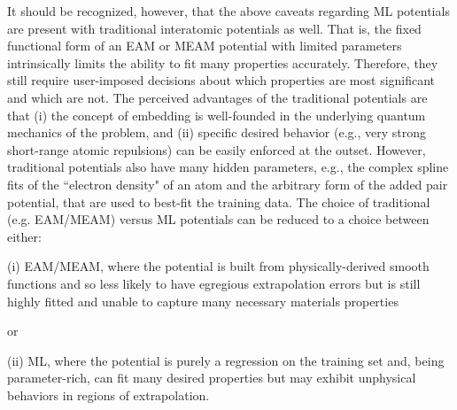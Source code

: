 \documentclass{article}
\begin{document}
It should be recognized, however, that the above caveats regarding ML potentials are present with traditional interatomic potentials as well.
That is, the fixed functional form of an EAM or MEAM potential with limited parameters intrinsically limits the ability to fit many properties accurately. 
Therefore, they still require user-imposed decisions about which properties are most significant and which are not.
The perceived advantages of the traditional potentials are that (i) the concept of embedding is well-founded in the underlying quantum mechanics of the problem, and (ii) specific desired behavior (e.g., very strong short-range atomic repulsions) can be easily enforced at the outset.
However, traditional potentials also have many hidden parameters, e.g., the complex spline fits of the ``electron density" of an atom and the arbitrary form of the added pair potential, that are used to best-fit the training data.  The choice of traditional (e.g. EAM/MEAM) versus ML potentials can be reduced to a choice between either:

(i) EAM/MEAM, where the potential is built from physically-derived smooth functions and so less likely to have egregious extrapolation errors but is still highly fitted and unable to capture many necessary materials properties  

or

(ii) ML, where the potential is purely a regression on the training set and, being parameter-rich, can fit many desired properties but may exhibit unphysical behaviors in regions of extrapolation.
\end{document}
